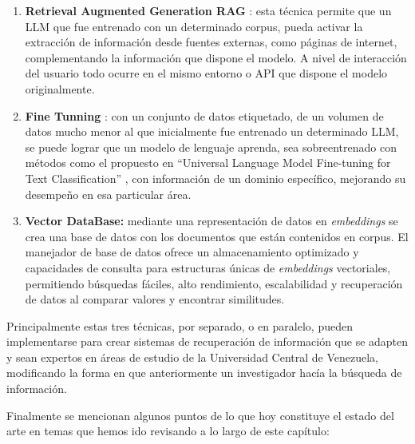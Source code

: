 \documentclass[
  10,
  openany]{book}
\begin{document}
\begin{enumerate}
\def\labelenumi{\arabic{enumi}.}
\item
  \textbf{Retrieval Augmented Generation RAG} \citep{lewis2020}: esta técnica permite que un LLM que fue entrenado con un determinado corpus, pueda activar la extracción de información desde fuentes externas, como páginas de internet, complementando la información que dispone el modelo. A nivel de interacción del usuario todo ocurre en el mismo entorno o API que dispone el modelo originalmente.
\item
  \textbf{Fine Tunning} \citep{lv2023}: con un conjunto de datos etiquetado, de un volumen de datos mucho menor al que inicialmente fue entrenado un determinado LLM, se puede lograr que un modelo de lenguaje aprenda, sea sobreentrenado con métodos como el propuesto en ``Universal Language Model Fine-tuning for Text Classification'' \citep{howard2018}, con información de un dominio específico, mejorando su desempeño en esa particular área.
\item
  \textbf{Vector DataBase:} mediante una representación de datos en \emph{embeddings} se crea una base de datos con los documentos que están contenidos en corpus. El manejador de base de datos ofrece un almacenamiento optimizado y capacidades de consulta para estructuras únicas de \emph{embeddings} vectoriales, permitiendo búsquedas fáciles, alto rendimiento, escalabilidad y recuperación de datos al comparar valores y encontrar similitudes.
\end{enumerate}

Principalmente estas tres técnicas, por separado, o en paralelo, pueden implementarse para crear sistemas de recuperación de información que se adapten y sean expertos en áreas de estudio de la Universidad Central de Venezuela, modificando la forma en que anteriormente un investigador hacía la búsqueda de información.

Finalmente se mencionan algunos puntos de lo que hoy constituye el estado del arte en temas que hemos ido revisando a lo largo de este capítulo:
\end{document}
